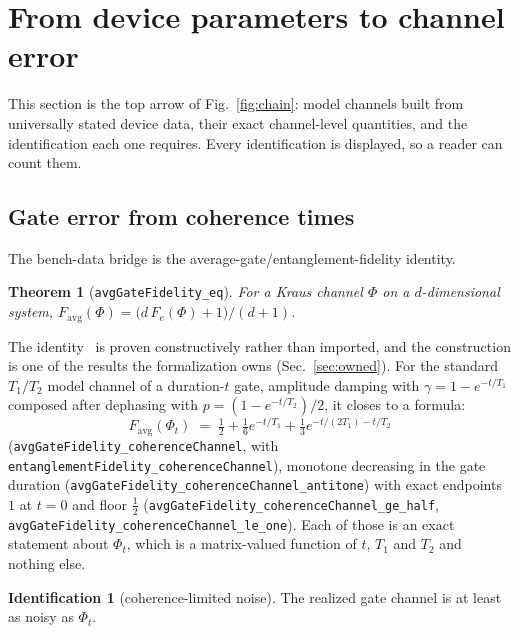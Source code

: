 \documentclass[aps,pra,reprint,nofootinbib,superscriptaddress]{revtex4-2}
\theoremstyle{plain}
\newtheorem{theorem}{Theorem}
\theoremstyle{definition}
\newtheorem{hypothesis}{Identification}
\theoremstyle{remark}
\newcommand{\lean}[1]{\texttt{#1}}
\begin{document}
\section{From device parameters to channel error}
\label{sec:params}

This section is the top arrow of Fig.~\ref{fig:chain}: model channels
built from universally stated device data, their exact channel-level
quantities, and the identification each one requires. Every
identification is displayed, so a reader can count them.

\subsection{Gate error from coherence times}

The bench-data bridge is the average-gate/entanglement-fidelity identity.

\begin{theorem}[\lean{avgGateFidelity\_eq}]
\label{thm:avgfid}
For a Kraus channel $\Phi$ on a $d$-dimensional system,
$F_{\mathrm{avg}}(\Phi) = \big(d\,F_e(\Phi)+1\big)/(d+1)$.
\end{theorem}

The identity~\cite{Horodecki1999,Nielsen2002} is proven constructively
rather than imported, and the construction is one of the results the
formalization owns (Sec.~\ref{sec:owned}). For the standard $T_1/T_2$
model channel of a duration-$t$ gate, amplitude damping with
$\gamma = 1-e^{-t/T_1}$ composed after dephasing with
$p = (1-e^{-t/T_2})/2$, it closes to a formula:
\[
F_{\mathrm{avg}}(\Phi_t) \;=\;
\tfrac12 + \tfrac16 e^{-t/T_1} + \tfrac13 e^{-t/(2T_1)-t/T_2}
\]
(\lean{avgGateFidelity\_coherenceChannel}, with
\lean{entanglementFidelity\_coherenceChannel}), monotone decreasing in
the gate duration (\lean{avgGateFidelity\_coherenceChannel\_antitone})
with exact endpoints $1$ at $t=0$ and floor $\tfrac12$
(\lean{avgGateFidelity\_coherenceChannel\_ge\_half},
\lean{avgGateFidelity\_coherenceChannel\_le\_one}). Each of those is an
exact statement about $\Phi_t$, which is a matrix-valued function of $t$,
$T_1$ and $T_2$ and nothing else.

\begin{hypothesis}[coherence-limited noise]
\label{id:coh}
The realized gate channel is at least as noisy as $\Phi_t$.
\end{hypothesis}
\end{document}
